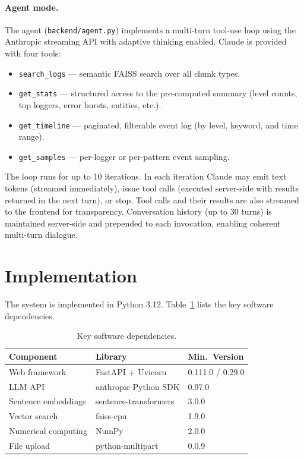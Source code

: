 \documentclass[runningheads]{llncs}
\begin{document}
\paragraph{Agent mode.}
The agent (\texttt{backend/agent.py}) implements a multi-turn tool-use loop
using the Anthropic streaming API with adaptive thinking enabled. Claude is
provided with four tools:

\begin{itemize}
  \item \texttt{search\_logs} --- semantic FAISS search over all chunk types.
  \item \texttt{get\_stats} --- structured access to the pre-computed summary
        (level counts, top loggers, error bursts, entities, etc.).
  \item \texttt{get\_timeline} --- paginated, filterable event log (by level,
        keyword, and time range).
  \item \texttt{get\_samples} --- per-logger or per-pattern event sampling.
\end{itemize}

The loop runs for up to 10 iterations. In each iteration Claude may emit text
tokens (streamed immediately), issue tool calls (executed server-side with
results returned in the next turn), or stop. Tool calls and their results are
also streamed to the frontend for transparency. Conversation history (up to
30 turns) is maintained server-side and prepended to each invocation,
enabling coherent multi-turn dialogue.

\section{Implementation}
\label{sec:impl}

The system is implemented in Python 3.12. Table~\ref{tab:deps} lists the key
software dependencies.

\begin{table}[htbp]
\centering
\caption{Key software dependencies.}
\label{tab:deps}
\begin{tabular}{lll}
\toprule
\textbf{Component} & \textbf{Library} & \textbf{Min.\ Version} \\
\midrule
Web framework        & FastAPI + Uvicorn       & 0.111.0 / 0.29.0 \\
LLM API              & anthropic Python SDK    & 0.97.0 \\
Sentence embeddings  & sentence-transformers   & 3.0.0 \\
Vector search        & faiss-cpu               & 1.9.0 \\
Numerical computing  & NumPy                   & 2.0.0 \\
File upload          & python-multipart        & 0.0.9 \\
\bottomrule
\end{tabular}
\end{table}
\end{document}
